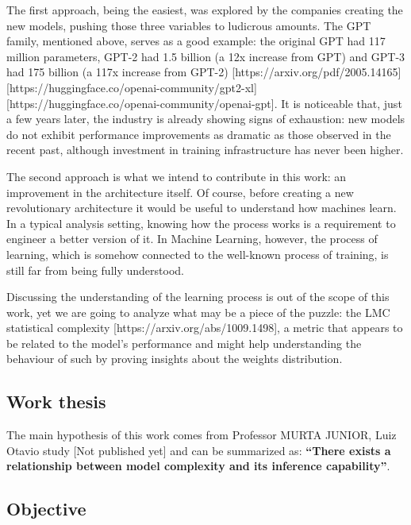 The first approach, being the easiest, was explored by the companies creating the new models, pushing those three variables to ludicrous amounts. The GPT family, mentioned above, serves as a good example: the original GPT had 117 million parameters, GPT-2 had 1.5 billion (a 12x increase from GPT) and GPT-3 had 175 billion (a 117x increase from GPT-2) [https://arxiv.org/pdf/2005.14165] [https://huggingface.co/openai-community/gpt2-xl] [https://huggingface.co/openai-community/openai-gpt]. It is noticeable that, just a few years later, the industry is already showing signs of exhaustion: new models do not exhibit performance improvements as dramatic as those observed in the recent past, although investment in training infrastructure has never been higher.

The second approach is what we intend to contribute in this work: an improvement in the architecture itself. Of course, before creating a new revolutionary architecture it would be useful to understand how machines learn. In a typical analysis setting, knowing how the process works is a requirement to engineer a better version of it. In Machine Learning, however, the process of learning, which is somehow connected to the well-known process of training, is still far from being fully understood.

Discussing the understanding of the learning process is out of the scope of this work, yet we are going to analyze what may be a piece of the puzzle: the LMC statistical complexity [https://arxiv.org/abs/1009.1498], a metric that appears to be related to the model’s performance and might help understanding the behaviour of such by proving insights about the weights distribution.

\subsection{Work thesis}

    The main hypothesis of this work comes from Professor MURTA JUNIOR, Luiz Otavio study [Not published yet] and can be summarized as: \textbf{“There exists a relationship between model complexity and its inference capability”}.

\subsection{Objective}


